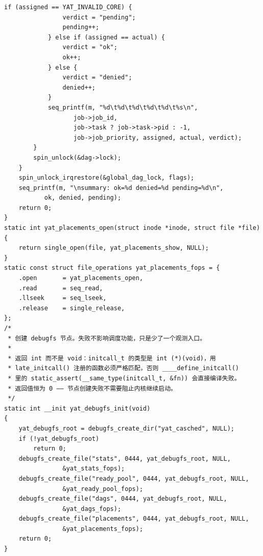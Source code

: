 \documentclass[10pt,a4paper]{article}
\newenvironment{yatpage}{\vspace*{0pt}}{\par}
\begin{document}
\begin{yatpage}
\begin{Verbatim}[fontsize=\fontsize{8.2}{9.8}\selectfont]
			if (assigned == YAT_INVALID_CORE) {
				verdict = "pending";
				pending++;
			} else if (assigned == actual) {
				verdict = "ok";
				ok++;
			} else {
				verdict = "denied";
				denied++;
			}
			seq_printf(m, "%d\t%d\t%d\t%d\t%d\t%s\n",
				   job->job_id,
				   job->task ? job->task->pid : -1,
				   job->job_priority, assigned, actual, verdict);
		}
		spin_unlock(&dag->lock);
	}
	spin_unlock_irqrestore(&global_dag_lock, flags);
	seq_printf(m, "\nsummary: ok=%d denied=%d pending=%d\n",
		   ok, denied, pending);
	return 0;
}
static int yat_placements_open(struct inode *inode, struct file *file)
{
	return single_open(file, yat_placements_show, NULL);
}
static const struct file_operations yat_placements_fops = {
	.open		= yat_placements_open,
	.read		= seq_read,
	.llseek		= seq_lseek,
	.release	= single_release,
};
/*
 * 创建 debugfs 节点。失败不影响调度功能，只是少了一个观测入口。
 *
 * 返回 int 而不是 void：initcall_t 的类型是 int (*)(void)，用
 * late_initcall() 注册的函数必须严格匹配，否则 ____define_initcall()
 * 里的 static_assert(__same_type(initcall_t, &fn)) 会直接编译失败。
 * 返回值恒为 0 —— 节点创建失败不需要阻止内核继续启动。
 */
static int __init yat_debugfs_init(void)
{
	yat_debugfs_root = debugfs_create_dir("yat_casched", NULL);
	if (!yat_debugfs_root)
		return 0;
	debugfs_create_file("stats", 0444, yat_debugfs_root, NULL,
			    &yat_stats_fops);
	debugfs_create_file("ready_pool", 0444, yat_debugfs_root, NULL,
			    &yat_ready_pool_fops);
	debugfs_create_file("dags", 0444, yat_debugfs_root, NULL,
			    &yat_dags_fops);
	debugfs_create_file("placements", 0444, yat_debugfs_root, NULL,
			    &yat_placements_fops);
	return 0;
}
\end{Verbatim}
\end{yatpage}
\newpage
\end{document}
